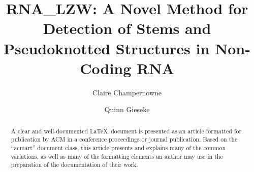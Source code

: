 \documentclass[sigconf]{acmart}
\begin{document}
\title{RNA\_LZW: A Novel Method for Detection of Stems and Pseudoknotted Structures in Non-Coding RNA}

\author{Claire Champernowne}

\author{Quinn Gieseke}

\renewcommand{\shortauthors}{Champernowne and Gieseke, et al.}

\begin{abstract}
  A clear and well-documented \LaTeX\ document is presented as an
  article formatted for publication by ACM in a conference proceedings
  or journal publication. Based on the ``acmart'' document class, this
  article presents and explains many of the common variations, as well
  as many of the formatting elements an author may use in the
  preparation of the documentation of their work.
\end{abstract}


\maketitle
\end{document}
